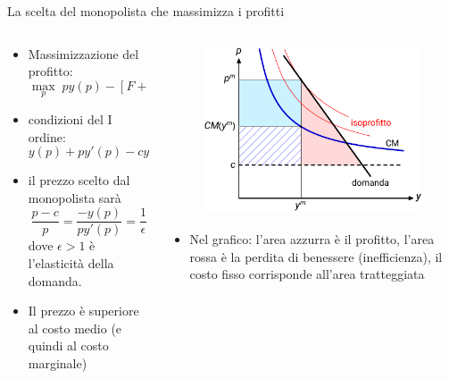 \documentclass[aspectratio=64,12pt]{beamer}
\begin{document}
\begin{frame}{La scelta del monopolista che massimizza i profitti}
\begin{columns}
\begin{column}{.45\columnwidth}
\begin{itemize}
\item Massimizzazione del profitto:
\begin{equation*}
\max_{p}\; py(p)-[F+cy(p)]
\end{equation*}
\item condizioni del I ordine:
\begin{equation*}
y(p) + py'(p) - cy'(p)=0
\end{equation*}
\item il prezzo scelto dal monopolista sarà
\begin{equation*}
\frac{p-c}{p}=\frac{-y(p)}{py'(p)}=\frac{1}{\epsilon}
\end{equation*}
dove $\epsilon>1$ è l'elasticità della domanda.
\item Il prezzo è superiore al costo medio (e quindi al
costo marginale)
\end{itemize}
\end{column}

\begin{column}{.55\columnwidth}
\begin{figure}[htbp]
\centering
\includegraphics[height=5cm]{./figure/monopolio-naturale-2-color.pdf}
\end{figure}

\begin{itemize}
\item Nel grafico: l'area azzurra è il profitto, l'area rossa è la perdita di benessere (inefficienza), il costo fisso corrisponde all'area tratteggiata
\end{itemize}
\end{column}
\end{columns}
\end{frame}
\end{document}
